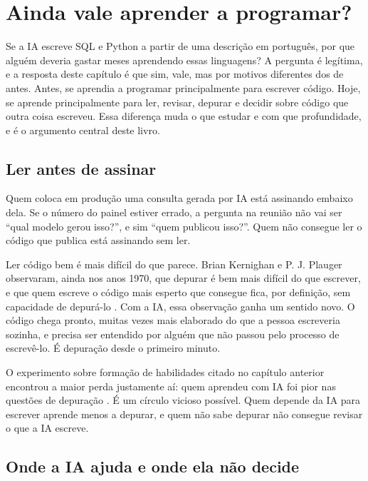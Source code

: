 \chapter{Ainda vale aprender a programar?}
\label{cap:programar}

Se a IA escreve SQL e Python a partir de uma descrição em português, por que alguém
deveria gastar meses aprendendo essas linguagens? A pergunta é legítima, e a resposta deste
capítulo é que sim, vale, mas por motivos diferentes dos de antes. Antes, se aprendia a
programar principalmente para escrever código. Hoje, se aprende principalmente para ler,
revisar, depurar e decidir sobre código que outra coisa escreveu. Essa diferença muda o
que estudar e com que profundidade, e é o argumento central deste livro.

\section{Ler antes de assinar}
\label{sec:ler-antes-assinar}

Quem coloca em produção uma consulta gerada por IA está assinando embaixo dela. Se o
número do painel estiver errado, a pergunta na reunião não vai ser \enquote{qual modelo
gerou isso?}, e sim \enquote{quem publicou isso?}. Quem não consegue ler o código que
publica está assinando sem ler.

Ler código bem é mais difícil do que parece. Brian Kernighan e P. J. Plauger observaram,
ainda nos anos 1970, que depurar é bem mais difícil do que escrever, e que quem escreve o
código mais esperto que consegue fica, por definição, sem capacidade de depurá-lo
\parencite{kernighan1978}.  Com a IA,
essa observação ganha um sentido novo. O código chega pronto, muitas vezes mais elaborado do
que a pessoa escreveria sozinha, e precisa ser entendido por alguém que não passou pelo
processo de escrevê-lo. É depuração desde o primeiro minuto.

O experimento sobre formação de habilidades citado no capítulo anterior encontrou a maior
perda justamente aí: quem aprendeu com IA foi pior nas questões de depuração
\parencite{shen2026}. É um círculo vicioso possível. Quem depende da IA para escrever
aprende menos a depurar, e quem não sabe depurar não consegue revisar o que a IA escreve.

\section{Onde a IA ajuda e onde ela não decide}
\label{sec:ajuda-nao-decide}

